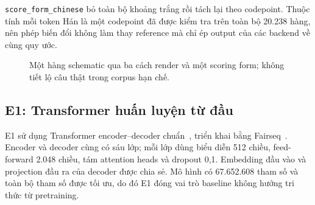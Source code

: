 \texttt{score\_form\_chinese} bỏ toàn bộ khoảng trắng rồi tách lại theo
codepoint. Thuộc tính mỗi token Hán là một codepoint đã được kiểm tra trên toàn
bộ 20.238 hàng, nên phép biến đổi không làm thay reference mà chỉ ép output
của các backend về cùng quy ước.

\begin{figure}[tbp]
  \centering
  \caption{Một hàng schematic qua ba cách render và một scoring form; không
  tiết lộ câu thật trong corpus hạn chế.}
  \label{fig:render-contract}
\end{figure}

\subsection{E1: Transformer huấn luyện từ đầu}

E1 sử dụng Transformer encoder--decoder chuẩn~\cite{vaswani2017attention},
triển khai bằng Fairseq~\cite{ott2019fairseq}. Encoder và decoder cùng có sáu
lớp; mỗi lớp dùng biểu diễn 512 chiều, feed-forward 2.048 chiều, tám attention
heads và dropout 0,1. Embedding đầu vào và projection đầu ra của decoder được
chia sẻ. Mô hình có 67.652.608 tham số và toàn bộ tham số được tối ưu, do đó
E1 đóng vai trò baseline không hưởng tri thức từ pretraining.

